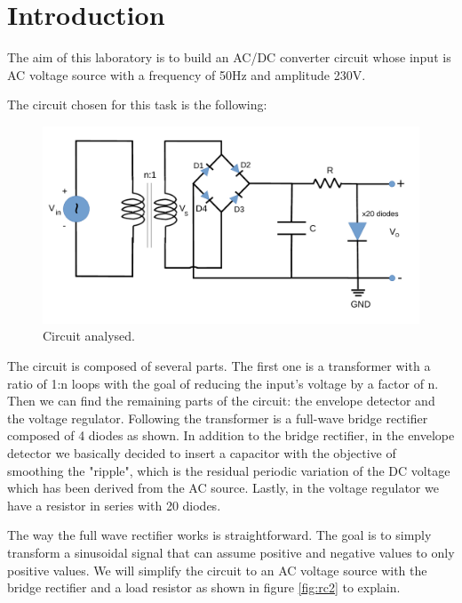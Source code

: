 \vspace{-0.25cm}
\section{Introduction}
\label{sec:introduction}
The aim of this laboratory is to build an AC/DC converter
circuit whose input is AC voltage source with a frequency of 50Hz
and amplitude 230V.

The circuit chosen for this task is the following:

\begin{figure}[h] \centering
    \includegraphics[scale=0.6]{lab3.pdf}
    \caption{Circuit analysed.}
    \label{fig:rc}
\end{figure}

The circuit is composed of several parts. The first one is a
transformer with a ratio of 1:n loops with the goal
of reducing the input's voltage by a factor of n.
Then we can find the remaining parts of the circuit: the envelope detector
and the voltage regulator.
Following the transformer is a full-wave bridge rectifier
composed of 4 diodes as shown.
In addition to the bridge rectifier, in the envelope detector we basically decided to insert a
capacitor with the objective of smoothing the "ripple", which is the residual
periodic variation of the DC voltage which has been derived from the AC source.
Lastly, in the voltage regulator we have a resistor in series with 20 diodes.


The way the full wave rectifier works is straightforward. The goal is to
simply transform a sinusoidal signal that can assume positive and negative values to only positive values.
We will simplify the circuit to an AC voltage source with the bridge rectifier and a load resistor as shown in figure \ref{fig:rc2} to explain.

